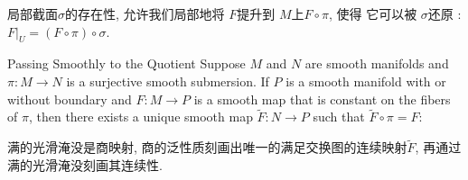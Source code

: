 \documentclass[../main.tex]{subfiles}
\begin{document}
\begin{proofsketch}
    局部截面\(   \sigma   \)的存在性, 允许我们局部地将 \(  F  \)提升到 \(  M  \)上\(  F\circ  \pi   \), 使得 它可以被 \(   \sigma   \)还原  : \( F|_{U}= \left(  F\circ  \pi   \right)\circ  \sigma   \).    
\end{proofsketch}

\begin{theorem}{Passing Smoothly to the Quotient}{}
Suppose $M$ and $N$ are smooth manifolds and $\pi : M \to N$ is a surjective smooth submersion. If $P$ is a smooth manifold with or without boundary and $F : M \to P$ is a smooth map that is constant on the fibers of $\pi$, then there exists a unique smooth map $\tilde{F} : N \to P$ such that $\tilde{F} \circ \pi = F$:
\begin{center}
\end{center}
\end{theorem}

\begin{proofsketch}
    满的光滑淹没是商映射, 商的泛性质刻画出唯一的满足交换图的连续映射\(  \tilde{F}  \), 再通过满的光滑淹没刻画其连续性. 
\end{proofsketch}
\end{document}
